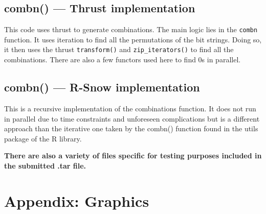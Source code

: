 \documentclass[titlepage, 11pt]{article}
\begin{document}
\subsection{combn() --- Thrust implementation}

This code uses thrust to generate combinations. The main logic lies in the \verb|combn| function. It uses iteration to find all the permutations of the bit strings. Doing so, it then uses the thrust \verb|transform()| and \verb|zip_iterators()| to find all the combinations. There are also a few functors used here to find 0s in parallel.

\subsection{combn() --- R-Snow implementation}

This is a recursive implementation of the combinations function. It does not run in parallel due to time constraints and unforeseen complications but is a different approach than the iterative one taken by the combn() function found in the utils package of the R library.

\textbf{There are also a variety of files specific for testing purposes included in the submitted .tar file.}

\section{Appendix: Graphics}
\end{document}
